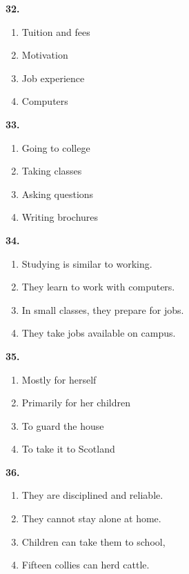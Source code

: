 \documentclass[12pt]{article}
\begin{document}
\par
\vspace{0.25\baselineskip}
\noindent\textbf{32.}
\begin{enumerate}[label=(\Alph*),leftmargin=*,itemsep=0.2em]
\item Tuition and fees
\item Motivation
\item Job experience
\item Computers
\end{enumerate}
\par
\vspace{0.25\baselineskip}
\noindent\textbf{33.}
\begin{enumerate}[label=(\Alph*),leftmargin=*,itemsep=0.2em]
\item Going to college
\item Taking classes
\item Asking questions
\item Writing brochures
\end{enumerate}
\par
\vspace{0.25\baselineskip}
\noindent\textbf{34.}
\begin{enumerate}[label=(\Alph*),leftmargin=*,itemsep=0.2em]
\item Studying is similar to working.
\item They learn to work with computers.
\item In small classes, they prepare for jobs.
\item They take jobs available on campus.
\end{enumerate}
\par
\vspace{0.25\baselineskip}
\noindent\textbf{35.}
\begin{enumerate}[label=(\Alph*),leftmargin=*,itemsep=0.2em]
\item Mostly for herself
\item Primarily for her children
\item To guard the house
\item To take it to Scotland
\end{enumerate}
\par
\vspace{0.25\baselineskip}
\noindent\textbf{36.}
\begin{enumerate}[label=(\Alph*),leftmargin=*,itemsep=0.2em]
\item They are disciplined and reliable.
\item They cannot stay alone at home.
\item Children can take them to school,
\item Fifteen collies can herd cattle.
\end{enumerate}
\end{document}

